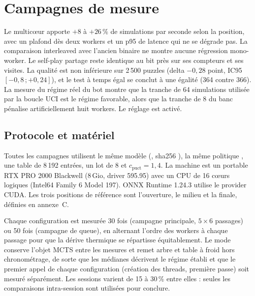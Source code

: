 \section{Campagnes de mesure}
\label{sec:mesures}

\begin{resume}
Le multic\oe{}ur apporte $+8$ \`a $+26\,\%$ de simulations par seconde selon la
position, avec un plafond d\`es deux workers et un p95 de latence qui ne se
d\'egrade pas. La comparaison interleaved avec l'ancien binaire ne montre
aucune r\'egression mono-worker. Le self-play partage reste identique au bit
pr\`es sur ses compteurs et ses visites. La qualit\'e est non inf\'erieure sur
2\,500 puzzles (delta $-0,28$ point, IC95 $[-0,8\,;+0,24]$), et le test \`a
temps \'egal se conclut \`a une \'egalit\'e (364 contre 366). La mesure du
r\'egime r\'eel du bot montre que la tranche de 64 simulations utilis\'ee par
la boucle UCI est le r\'egime favorable, alors que la tranche de 8 du banc
p\'enalise artificiellement huit workers. Le r\'eglage
 est activ\'e.
\end{resume}

\subsection{Protocole et mat\'eriel}

Toutes les campagnes utilisent le m\^eme mod\`ele
(, sha256
), la m\^eme politique , une table de
8\,192 entr\'ees, un lot de 8 et $c_{\text{puct}} = 1{,}4$. La machine est un
portable RTX PRO 2000 Blackwell (8\,Gio, driver 595.95) avec un CPU de
16 c\oe{}urs logiques (Intel64 Family 6 Model 197). ONNX Runtime 1.24.3
utilise le provider CUDA. Les trois positions de r\'ef\'erence sont
l'ouverture, le milieu et la finale, d\'efinies en annexe~C.

\begin{mesure}
Chaque configuration est mesur\'ee 30 fois (campagne principale,
$5 \times 6$ passages) ou 50 fois (campagne de queue), en alternant l'ordre
des workers \`a chaque passage pour que la d\'erive thermique se r\'epartisse
\'equitablement. Le mode  conserve l'objet MCTS entre les
mesures et remet arbre et table \`a froid hors chronom\'etrage, de sorte que
les m\'edianes d\'ecrivent le r\'egime \'etabli et que le premier appel de
chaque configuration (cr\'eation des threads, premi\`ere passe) soit mesur\'e
s\'epar\'ement. Les sessions varient de 15 \`a 30\,\% entre elles : seules les
comparaisons intra-session sont utilis\'ees pour conclure.
\end{mesure}

